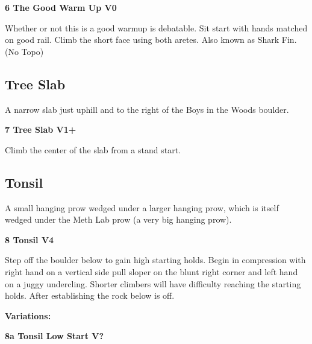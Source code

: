 \begin{multicols}{2}
			\label{rt:The Good Warm Up}
\colorbox{green!20}{
\parbox{0.95\linewidth}{
\textbf{
6 The Good Warm Up V0  
}
}
}

			\begin{adjustwidth}{0.5cm}{}				
			Whether or not this is a good warmup is debatable. Sit start with hands matched on good rail. Climb the short face using both aretes. Also known as Shark Fin.
				\newline (No Topo) 
			\end{adjustwidth}
		\subsection*{Tree Slab}\label{bf:Tree Slab}
		A narrow slab just uphill and to the right of the Boys in the Woods boulder.\\
	
			\label{rt:Tree Slab}
\colorbox{green!20}{
\parbox{0.95\linewidth}{
\textbf{
7 Tree Slab V1+  
}
}
}

			\begin{adjustwidth}{0.5cm}{}				
			Climb the center of the slab from a stand start.
			\end{adjustwidth}
		\subsection*{Tonsil}\label{bf:Tonsil}
		A small hanging prow wedged under a larger hanging prow, which is itself wedged under the Meth Lab prow (a very big hanging prow).\\
	

			\label{rt:Tonsil}
\colorbox{RoyalBlue!20}{
\parbox{0.95\linewidth}{
\textbf{
8 Tonsil V4  
}
}
}

			\begin{adjustwidth}{0.5cm}{}				
			Step off the boulder below to gain high starting holds. Begin in compression with right hand on a vertical side pull sloper on the blunt right corner and left hand on a juggy undercling.  Shorter climbers will have difficulty reaching the starting holds. After establishing the rock below is off.
			\end{adjustwidth}
				\begin{adjustwidth}{0.5cm}{}				
				\textbf{Variations:} \newline
					\label{vr:Tonsil Low Start}
\colorbox{black!20}{
\parbox{0.95\linewidth}{
\textbf{
8a Tonsil Low Start V?  
}
}
}


\end{adjustwidth}
\end{multicols}

